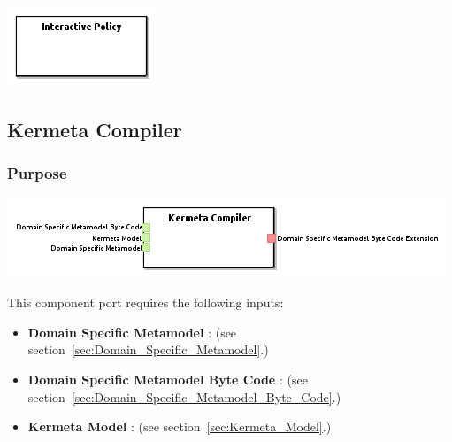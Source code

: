 \documentclass{gemoc} %
\begin{document}
\begin{center}
\includegraphics*[trim=0.0cm 0.0cm 0cm 0.0cm, clip=true]{../images/generated/Generated_Interactive_Policy.png}
\end{center}




\subsection{Kermeta Compiler}
\label{sec:Kermeta_Compiler}


\subsubsection{Purpose}


\begin{center}
\includegraphics*[trim=0.0cm 0.0cm 0cm 0.0cm, clip=true]{../images/generated/Generated_Kermeta_Compiler.png}
\end{center}

This component port requires the following inputs:
\begin{itemize}
  \item \textbf{Domain Specific Metamodel} :
(see section~\ref{sec:Domain_Specific_Metamodel}.)
  \item \textbf{Domain Specific Metamodel Byte Code} :
(see section~\ref{sec:Domain_Specific_Metamodel_Byte_Code}.)
  \item \textbf{Kermeta Model} :
(see section~\ref{sec:Kermeta_Model}.)
\end{itemize}
\end{document}
